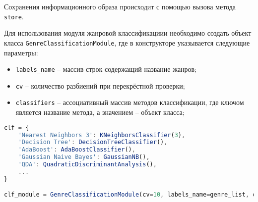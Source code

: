 Сохранения информационного образа  происходит с помощью вызова  метода \texttt{store}.


Для использования модуля жанровой классификациии необходимо создать объект класса \texttt{GenreClassificationModule}, где в конструкторе  указывается следующие параметры:

\begin{itemize} 
\item \texttt{labels\_name} -- массив строк содержащий название жанров;
\item \texttt{cv}  -- количество разбиений при перекрёстной проверки;
\item \texttt{classifiers}  -- ассоциативный массив методов классификации, где ключом является название метода, а значением  -- объект класса;
\end{itemize}

\begin{lstlisting}[language=TypeScript, label=lst:testing:results]
clf = {
    'Nearest Neighbors 3': KNeighborsClassifier(3),
    'Decision Tree': DecisionTreeClassifier(),
    'AdaBoost': AdaBoostClassifier(),
    'Gaussian Naive Bayes': GaussianNB(),
    'QDA': QuadraticDiscriminantAnalysis(),
    ...
}

clf_module = GenreClassificationModule(cv=10, labels_name=genre_list, classifiers=clf)
				 
\end{lstlisting}



